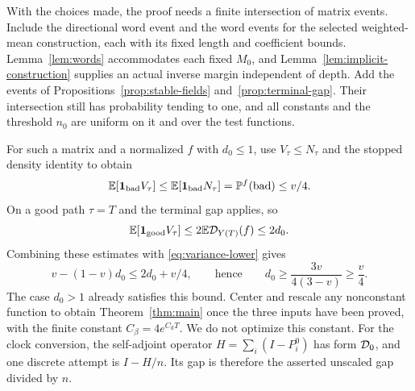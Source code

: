 With the choices made, the proof needs a finite intersection of matrix
events. Include the directional word event and the word events for the
selected weighted-mean construction, each with its fixed length and
coefficient bounds. Lemma~\ref{lem:words} accommodates each fixed
$M_0$, and Lemma~\ref{lem:implicit-construction} supplies an actual
inverse margin independent of depth. Add the events of
Propositions~\ref{prop:stable-fields} and~\ref{prop:terminal-gap}.
Their intersection still has probability tending to one, and all constants
and the threshold $n_0$ are uniform on it and over the test functions.

For such a matrix and a normalized $f$ with $d_0\le1$, use $V_\tau\le N_\tau$
and the stopped density identity to obtain
\[
 \mathbb E[\mathbf 1_{\mathrm{bad}}V_\tau]
 \le\mathbb E[\mathbf 1_{\mathrm{bad}}N_\tau]
 =\mathbb P^f(\mathrm{bad})\le v/4.
\]
On a good path $\tau=T$ and the terminal gap applies, so
\[
 \mathbb E[\mathbf 1_{\mathrm{good}}V_\tau]
 \le2\mathbb E\mathcal D_{Y(T)}(f)\le2d_0.
\]
Combining these estimates with \eqref{eq:variance-lower} gives
\[
 v-(1-v)d_0\le2d_0+v/4,
 \qquad\text{hence}\qquad
 d_0\ge\frac{3v}{4(3-v)}\ge\frac v4.
\]
The case $d_0>1$ already satisfies this bound. Center and rescale any
nonconstant function to obtain Theorem~\ref{thm:main} once the three
inputs have been proved, with the finite constant
$C_\beta=4e^{C_{\mathrm d}T}$. We do not optimize this constant.
For the clock conversion, the self-adjoint operator
$H=\sum_i(I-P_i^0)$ has form $\mathcal D_0$, and one discrete attempt is
$I-H/n$. Its gap is therefore the asserted unscaled gap divided by $n$.
